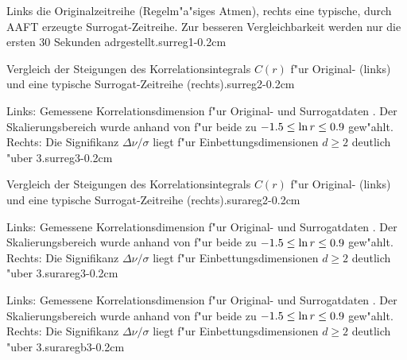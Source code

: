 {
{Links die Originalzeitreihe (Regelm"a"siges Atmen), rechts eine typische, durch AAFT
erzeugte Surrogat-Zeitreihe. Zur besseren Vergleichbarkeit  werden nur die ersten 30
Sekunden adrgestellt.}{surreg1}{-0.2cm}

{Vergleich der Steigungen des Korrelationsintegrals $C(r)$ f"ur Original- (links) und eine
typische Surrogat-Zeitreihe (rechts).}{surreg2}{-0.2cm}

{Links: Gemessene Korrelationsdimension f"ur Original- \captimes und Surrogatdaten
\capplus. Der Skalierungsbereich wurde anhand von  f"ur beide 
zu $-1.5\leq\ln r\leq\-0.9$ gew"ahlt. Rechts: Die Signifikanz $\Delta\nu/\sigma$ liegt
f"ur Einbettungsdimensionen $d\geq 2$ deutlich "uber $3$.}{surreg3}{-0.2cm} 


\newpage


{Vergleich der Steigungen des Korrelationsintegrals $C(r)$ f"ur Original- (links) und eine
typische Surrogat-Zeitreihe (rechts).}{surareg2}{-0.2cm}

{Links: Gemessene Korrelationsdimension f"ur Original- \captimes und Surrogatdaten
\capplus. Der Skalierungsbereich wurde anhand von  f"ur beide 
zu $-1.5\leq\ln r\leq\-0.9$ gew"ahlt. Rechts: Die Signifikanz $\Delta\nu/\sigma$ liegt
f"ur Einbettungsdimensionen $d\geq 2$ deutlich "uber $3$.}{surareg3}{-0.2cm} 

{Links: Gemessene Korrelationsdimension f"ur Original- \captimes und Surrogatdaten
\capplus. Der Skalierungsbereich wurde anhand von  f"ur beide 
zu $-1.5\leq\ln r\leq\-0.9$ gew"ahlt. Rechts: Die Signifikanz $\Delta\nu/\sigma$ liegt
f"ur Einbettungsdimensionen $d\geq 2$ deutlich "uber $3$.}{suraregb3}{-0.2cm} 

}









